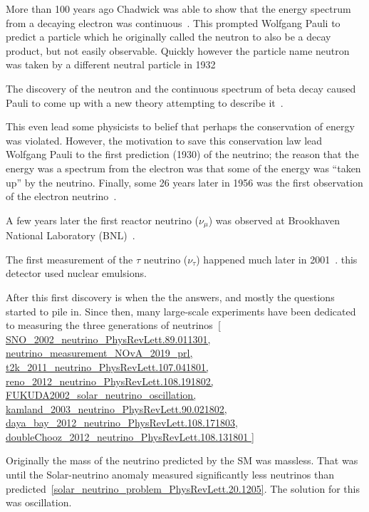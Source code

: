 More than 100 years ago Chadwick was able to show that the energy spectrum from a decaying electron was continuous~\citep{Chadwick:1914zz}.
This prompted Wolfgang Pauli to predict a particle which he originally called the neutron to also be a decay product, but not easily observable.
Quickly however the particle name neutron was taken by a different neutral particle in 1932~\citep{Chadwick1932PossibleEO}

The discovery of the neutron and the continuous spectrum of beta decay caused Pauli to come up with a new theory attempting to describe it~\citep{pauli_1934}.

This even lead some physicists to belief that perhaps the conservation of energy was violated.
However, the motivation to save this conservation law lead Wolfgang Pauli to the first prediction (1930) of the neutrino; the reason that the energy was a spectrum from the electron was that some of the energy was ``taken up'' by the neutrino.
Finally, some 26 years later in 1956 was the first observation of the electron neutrino~\citep{first_neutrino_measurement}.

A few years later the first reactor neutrino ($\nu_{\mu}$) was observed at Brookhaven National Laboratory (BNL)~\citep{PhysRevLett.9.36}.

The first measurement of the $\tau$ neutrino ($\nu_{\tau}$) happened much later in 2001~\citep{donut_first_tau_n_measure}.
this detector used nuclear emulsions.



After this first discovery is when the the answers, and mostly the questions started to pile in.
Since then, many large-scale experiments have been dedicated to measuring the three generations of neutrinos~\ref{
SNO_2002_neutrino_PhysRevLett.89.011301, neutrino_measurement_NOvA_2019_prl, t2k_2011_neutrino_PhysRevLett.107.041801,
reno_2012_neutrino_PhysRevLett.108.191802,
FUKUDA2002_solar_neutrino_oscillation,
kamland_2003_neutrino_PhysRevLett.90.021802,
daya_bay_2012_neutrino_PhysRevLett.108.171803,
doubleChooz_2012_neutrino_PhysRevLett.108.131801
}

Originally the mass of the neutrino predicted by the SM was massless.
That was until the Solar-neutrino anomaly measured significantly less neutrinos than predicted~\ref{solar_neutrino_problem_PhysRevLett.20.1205}.
The solution for this was oscillation.

